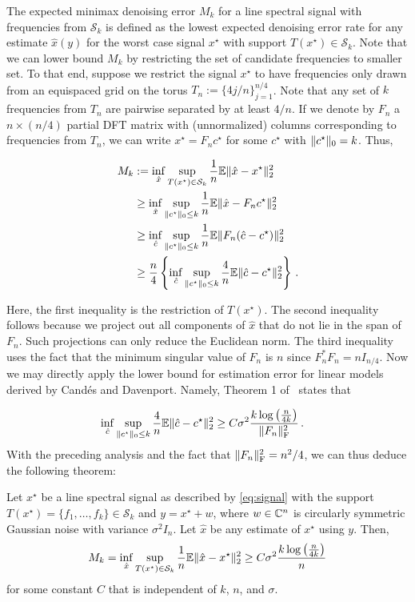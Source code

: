 The expected minimax denoising error $M_k$ for a line spectral signal with
frequencies from $\mathcal{S}_k$ is defined as the lowest expected denoising
error rate for any estimate $\hat{x}(y)$ for the worst case signal $x^\star$
with support $T(x^\star) \in \mathcal{S}_k$. Note that we can lower bound $M_k$
by restricting the set of candidate frequencies to smaller set. To that end,
suppose we restrict the signal $x^\star$ to have frequencies only drawn from an
equispaced grid on the torus $T_n := \{ 4 j/n \}_{j=1}^{n/4}$. Note that any set
of $k$ frequencies from $T_n$ are pairwise separated by at least $4/n$. If we
denote by $F_n$ a $n \times (n/4)$ partial DFT matrix with (unnormalized)
columns corresponding to frequencies from $T_n$, we can write $x^\star = F_n
c^\star$ for some $c^\star$ with $\lVert c^\star\rVert_0 = k$. Thus,

\begin{align*}
M_k &:= \inf_{\hat{x}}
 \sup_{
	T(x^\star) \in \mathcal{S}_k}
\frac{1}{n} \mathbb{E} \lVert\hat{x} - x^\star\rVert_2^2
	\\
&\geq \inf_{\hat{x}} 
 \sup_{
	\lVert c^\star\rVert_0 \leq k
	} \frac{1}{n} \mathbb{E} \lVert\hat{x} - F_n c^\star\rVert_2^2\\
&\geq \inf_{\hat{c}}
 \sup_{\lVert c^\star\rVert_0 \leq k} \frac{1}{n} \mathbb{E} \lVert F_n(\hat{c} - c^\star)\rVert_2^2\\
&\geq  \frac{n}{4} \left\{ \inf_{\hat{c}}
 \sup_{\lVert c^\star\rVert_0 \leq k}\frac{4}{n} \mathbb{E} \lVert\hat{c} - c^\star\rVert_2^2\right\}\,.
\end{align*}

Here, the first inequality is the restriction of $T(x^\star)$. The second
inequality follows because we project out all components of $\hat{x}$ that do
not lie in the span of $F_n$. Such projections can only reduce the Euclidean
norm. The third inequality uses the fact that the minimum singular value of
$F_n$ is $n$ since $F_n^*F_n = n I_{{n}/{4}}$. Now we may directly apply the
lower bound for estimation error for linear models derived by Cand\'es and
Davenport. Namely, Theorem 1 of~\cite{cd_minimax} states that

\begin{align*}
\inf_{\hat{c}}
 \sup_{\lVert c^\star\rVert_0 \leq k} \frac{4}{n} \mathbb{E} \lVert\hat{c} - c^\star\rVert_2^2&\geq {C} \sigma^2 \frac{k \log\left(\frac{n}{4k}\right)}{\lVert F_n\rVert_\mathrm{F}^2}\,.
 \end{align*} With the preceding analysis and the fact that $\lVert F_n\rVert_{\mathrm{F}}^2 = n^2/4$, we can thus deduce the following theorem:
 \begin{theorem}
\label{minimax}
Let $x^\star$ be a line spectral signal as described by \eqref{eq:signal} with the support $T(x^\star) = \{f_1, \dots, f_k\} \in \mathcal{S}_k$ and $y = x^\star + w$, where $w \in \mathbb{C}^n$ is circularly symmetric Gaussian noise with variance $\sigma^2 I_n$. Let $\hat{x}$ be any estimate of $x^\star$ using $y$. Then,
\[
M_k = \inf_{\hat{x}}
 \sup_{
	T(x^\star) \in \mathcal{S}_k}
\frac{1}{n} \mathbb{E} \lVert\hat{x} - x^\star\rVert_2^2
\geq C\sigma^2 \frac{k \log\left(\frac{n}{4k}\right)}{n}
\]
for some constant $C$ that is independent of $k$, $n$, and $\sigma$.
\end{theorem}


